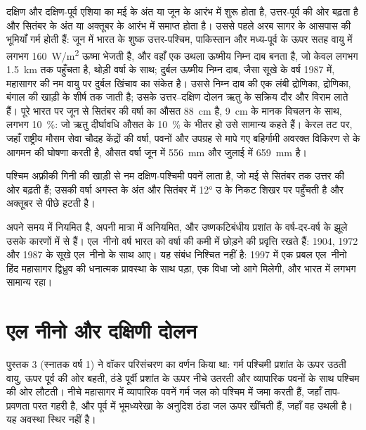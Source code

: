 दक्षिण और दक्षिण-पूर्व एशिया का  मई के अंत या जून के आरंभ में शुरू होता है, उत्तर-पूर्व की ओर
बढ़ता है और सितंबर के अंत या अक्तूबर के आरंभ में समाप्त होता है। उससे पहले
अरब सागर के आसपास की भूमियाँ गर्म होती हैं: जून में भारत के शुष्क उत्तर-पश्चिम, पाकिस्तान और मध्य-पूर्व के ऊपर सतह
वायु में लगभग \qty{160}{W/m^2} ऊष्मा भेजती है, और वहाँ एक उथला ऊष्मीय निम्न दाब बनता है,
जो केवल लगभग \qty{1.5}{km} तक पहुँचता है, थोड़ी वर्षा के साथ; दुर्बल ऊष्मीय निम्न दाब, जैसा सूखे के वर्ष
1987 में, महासागर की नम वायु पर दुर्बल खिंचाव का संकेत है। उससे निम्न दाब की एक लंबी द्रोणिका, 
द्रोणिका, बंगाल की खाड़ी के शीर्ष तक जाती है; उसके उत्तर--दक्षिण दोलन ऋतु के सक्रिय
दौर और विराम लाते हैं। पूरे भारत पर जून से सितंबर की वर्षा का औसत
\qty{88}{cm} है, \qty{9}{cm} के मानक विचलन के साथ, लगभग \qty{10}{\percent}: जो ऋतु दीर्घावधि औसत के
\qty{10}{\percent} के भीतर हो उसे सामान्य कहते हैं। केरल तट पर, जहाँ
राष्ट्रीय मौसम सेवा चौदह केंद्रों की वर्षा, पवनों और उपग्रह से मापे गए बहिर्गामी
अवरक्त विकिरण से  के आगमन की घोषणा करती है, औसत वर्षा जून में
\qty{556}{mm} और जुलाई में \qty{659}{mm} है।

पश्चिम अफ़्रीकी  गिनी की खाड़ी से नम दक्षिण-पश्चिमी पवनें लाता है, जो मई से सितंबर तक
उत्तर की ओर बढ़ती हैं; उसकी वर्षा अगस्त के अंत और सितंबर में \ang{12} उ के निकट शिखर पर पहुँचती है और
अक्तूबर से पीछे हटती है।

 अपने समय में नियमित है, अपनी मात्रा में अनियमित, और उष्णकटिबंधीय प्रशांत के वर्ष-दर-वर्ष के झूले
उसके कारणों में से हैं। एल~नीनो वर्ष भारत को वर्षा की कमी में छोड़ने की प्रवृत्ति रखते हैं:
1904, 1972 और 1987 के सूखे एल~नीनो के साथ आए। यह संबंध निश्चित नहीं है: 1997 में एक प्रबल
एल~नीनो हिंद महासागर द्विध्रुव की धनात्मक प्रावस्था के साथ पड़ा, एक विधा जो आगे मिलेगी, और भारत में
लगभग सामान्य  रहा।

\section{एल नीनो और दक्षिणी दोलन}\label{sec:b2:climate-variability:enso}

पुस्तक 3 (स्नातक वर्ष 1) ने वॉकर परिसंचरण का वर्णन किया था: गर्म पश्चिमी प्रशांत के ऊपर उठती वायु,
ऊपर पूर्व की ओर बहती, ठंडे पूर्वी प्रशांत के ऊपर नीचे उतरती और व्यापारिक पवनों के साथ
पश्चिम की ओर लौटती। नीचे महासागर में व्यापारिक पवनें गर्म जल को पश्चिम में जमा करती हैं, जहाँ ताप-प्रवणता परत
गहरी है, और पूर्व में भूमध्यरेखा के अनुदिश ठंडा जल ऊपर खींचती हैं, जहाँ वह उथली है। यह अवस्था
स्थिर नहीं है।

